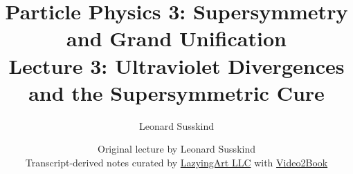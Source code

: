 \documentclass[11pt,oneside]{book}
\begin{document}
\frontmatter
\title{Particle Physics 3: Supersymmetry and Grand Unification\\[0.5em]
\large Lecture 3: Ultraviolet Divergences and the Supersymmetric Cure}
\author{Leonard Susskind}
\date{Original lecture by Leonard Susskind\\[0.4em]
Transcript-derived notes curated by
\href{https://lazying.art}{LazyingArt LLC} with
\href{https://github.com/lachlanchen/Video2Book}{Video2Book}}
\maketitle
\mainmatter

\end{document}
